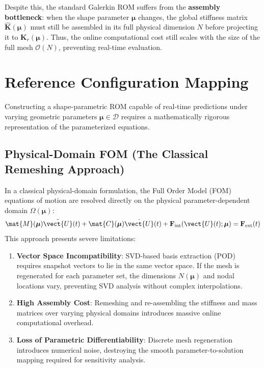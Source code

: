 Despite this, the standard Galerkin ROM suffers from the \textbf{assembly bottleneck}: when the shape parameter $\boldsymbol{\mu}$ changes, the global stiffness matrix $\hat{\mathbf{K}}(\boldsymbol{\mu})$ must still be assembled in its full physical dimension $N$ before projecting it to $\mathbf{K}_r(\boldsymbol{\mu})$. Thus, the online computational cost still scales with the size of the full mesh $\mathcal{O}(N)$, preventing real-time evaluation.


\section{Reference Configuration Mapping} \label{sec:pullback}
Constructing a shape-parametric ROM capable of real-time predictions under varying geometric parameters $\boldsymbol{\mu} \in \mathcal{D}$ requires a mathematically rigorous representation of the parameterized equations. 

\subsection{Physical-Domain FOM (The Classical Remeshing Approach)}
In a classical physical-domain formulation, the Full Order Model (FOM) equations of motion are resolved directly on the physical parameter-dependent domain $\Omega(\boldsymbol{\mu})$:
\begin{equation}
\mat{M}(\boldsymbol{\mu})\ddot{\vect{U}}(t) + \mat{C}(\boldsymbol{\mu})\dot{\vect{U}}(t) + \mathbf{F}_{\text{int}}(\vect{U}(t); \boldsymbol{\mu}) = \mathbf{F}_{\text{ext}}(t)
\end{equation}
This approach presents severe limitations:
\begin{enumerate}
    \item \textbf{Vector Space Incompatibility}: SVD-based basis extraction (POD) requires snapshot vectors to lie in the same vector space. If the mesh is regenerated for each parameter set, the dimensions $N(\boldsymbol{\mu})$ and nodal locations vary, preventing SVD analysis without complex interpolations.
    \item \textbf{High Assembly Cost}: Remeshing and re-assembling the stiffness and mass matrices over varying physical domains introduces massive online computational overhead.
    \item \textbf{Loss of Parametric Differentiability}: Discrete mesh regeneration introduces numerical noise, destroying the smooth parameter-to-solution mapping required for sensitivity analysis.
\end{enumerate}

